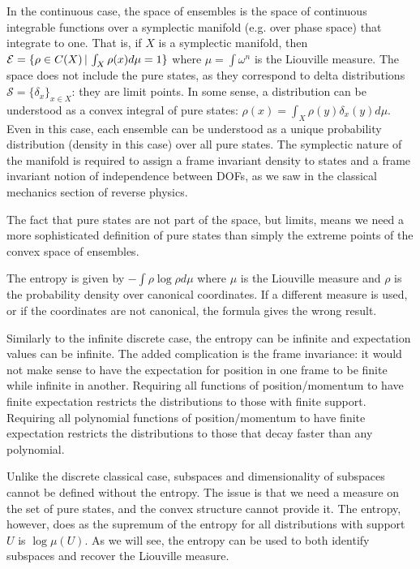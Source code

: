 In the continuous case, the space of ensembles is the space of continuous integrable functions over a symplectic manifold (e.g.  over phase space) that integrate to one. That is, if $X$ is a symplectic manifold, then $\mathcal{E} = \{ \rho \in C(X) \, | \, \int_X \rho(x) d\mu = 1 \} $ where $\mu=\int \omega^n$ is the Liouville measure. The space does not include the pure states, as they correspond to delta distributions $\mathcal{S} = \{\delta_x\}_{x \in X}$: they are limit points. In some sense, a distribution can be understood as a convex integral of pure states: $\rho(x) = \int_X \rho(y) \delta_x(y) d\mu$. Even in this case, each ensemble can be understood as a unique probability distribution (density in this case) over all pure states. The symplectic nature of the manifold is required to assign a frame invariant density to states and a frame invariant notion of independence between DOFs, as we saw in the classical mechanics section of reverse physics.

The fact that pure states are not part of the space, but limits, means we need a more sophisticated definition of pure states than simply the extreme points of the convex space of ensembles.

The entropy is given by $- \int \rho \log \rho d\mu$ where $\mu$ is the Liouville measure and $\rho$ is the probability density over canonical coordinates. If a different measure is used, or if the coordinates are not canonical, the formula gives the wrong result.

Similarly to the infinite discrete case, the entropy can be infinite and expectation values can be infinite. The added complication is the frame invariance: it would not make sense to have the expectation for position in one frame to be finite while infinite in another. Requiring all functions of position/momentum to have finite expectation restricts the distributions to those with finite support. Requiring all polynomial functions of position/momentum to have finite expectation restricts the distributions to those that decay faster than any polynomial.

Unlike the discrete classical case, subspaces and dimensionality of subspaces cannot be defined without the entropy. The issue is that we need a measure on the set of pure states, and the convex structure cannot provide it. The entropy, however, does as the supremum of the entropy for all distributions with support $U$ is $\log \mu(U)$. As we will see, the entropy can be used to both identify subspaces and recover the Liouville measure.

